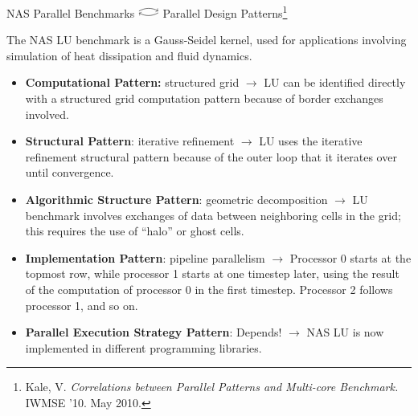 \begin{frame}{NAS Parallel Benchmarks $\curvedrightleft$ Parallel Design Patterns\footnote{\tiny Kale, V. {\it Correlations between Parallel Patterns and Multi-core Benchmark.} IWMSE '10. May 2010.}} 

{\footnotesize The NAS LU benchmark is a Gauss-Seidel kernel, used for applications involving simulation of heat dissipation and fluid dynamics.}
\begin{itemize}
   \footnotesize \item \footnotesize {\bf Computational Pattern:} structured grid $\rightarrow$ LU can be identified directly with a structured grid computation pattern because of border exchanges involved. 
    \item \footnotesize {\bf Structural Pattern}: iterative refinement $\rightarrow$ LU uses the iterative refinement structural pattern because of the outer loop that it iterates over until convergence. 
    \item \footnotesize {\bf Algorithmic Structure Pattern}: geometric decomposition $\rightarrow$ LU benchmark involves exchanges of data between neighboring cells in the grid; this requires the use of “halo” or ghost cells.
    \item \footnotesize {\bf Implementation Pattern}: pipeline parallelism $\rightarrow$ Processor 0 starts at the topmost row, while processor 1 starts at one timestep later, using the result of the computation of processor 0 in the first timestep. Processor 2 follows processor 1, and so on. 
    \item \footnotesize {\bf Parallel Execution Strategy Pattern}: Depends! $\rightarrow$ NAS LU  is now implemented in different programming libraries.
\end{itemize}
\end{frame}

 
